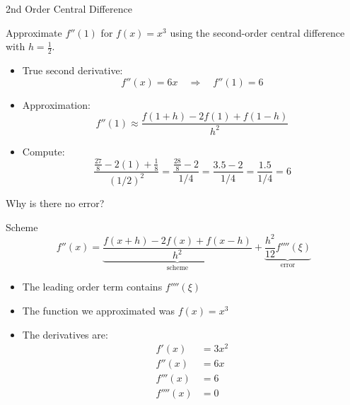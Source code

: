 \documentclass[10pt]{beamer}
\begin{document}
\begin{frame}{2nd Order Central Difference}
\begin{example}
Approximate $f''(1)$ for $f(x)=x^3$ using the second-order central difference with $h=\tfrac12$.
\end{example}

\begin{itemize}
    \item True second derivative:
    \[
    f''(x) = 6x \quad \Rightarrow \quad f''(1)=6
    \]

    \item Approximation:
    \[
    f''(1) \approx \frac{f(1+h)-2f(1)+f(1-h)}{h^2}
    \]

    \item Compute:
    \[
    \frac{\frac{27}{8}-2(1)+\frac{1}{8}}{(1/2)^2}
    = \frac{\frac{28}{8}-2}{1/4}
    = \frac{3.5 - 2}{1/4}
    = \frac{1.5}{1/4}
    = 6
    \]
\end{itemize}
\end{frame}

\begin{frame}{Why is there no error?}

\begin{block}{Scheme}
    $$f''(x) = \underbrace{\frac{f(x+h)-2f(x)+f(x-h)}{h^2}}_{\text{scheme}} + \underbrace{\frac{h^2}{12}f''''(\xi)}_{\text{error}}$$
\end{block}
\begin{itemize}
    \item The leading order term contains $f''''(\xi)$

    \item The function we approximated was $f(x)=x^3$

    \item The derivatives are:
    \begin{align*}
        f'(x) &= 3x^2\\
        f''(x) &= 6x\\
        f'''(x) &= 6\\
        f''''(x) &= 0
    \end{align*}
\end{itemize}
\end{frame}
\end{document}
